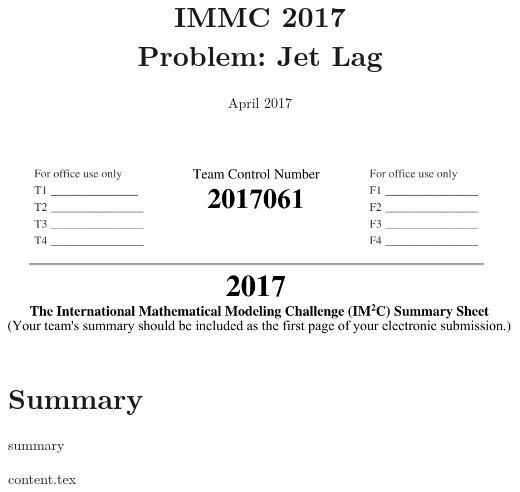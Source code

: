 \documentclass{article}
\title{IMMC 2017 \\
	\large Problem: Jet Lag}
\date{April 2017}
\begin{document}
\setlength{\abovedisplayskip}{0pt}
\setlength{\abovedisplayskip}{0pt}
\setlength{\belowdisplayskip}{0pt}

\thispagestyle{empty}

\vspace{1cm}
\begin{center}
\includegraphics[width=0.9\linewidth]{immc_form.pdf}
\end{center}

\vspace{2cm}
\section{Summary}
{summary}
\vfill

\clearpage
\tableofcontents
	\clearpage

{content.tex}
\end{document}
